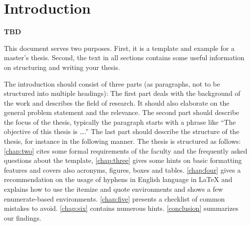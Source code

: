 \chapter{Introduction}
\label{chap:one}

\textbf{TBD}


This document serves two purposes. First, it is a template and example for a master's thesis. Second, the text in all sections contains some useful information on structuring and writing your thesis.

The introduction should consist of three parts (as paragraphs, not to be structured into multiple headings): The first part deals with the background of the work and describes the field of research. 
It should also elaborate on the general problem statement and the relevance. 
The second part should describe the focus of the thesis, typically the paragraph starts with a phrase like ``The objective of this thesis is \ldots.'' 
The last part should describe the structure of the thesis, for instance in the following manner. 
The thesis is structured as follows: \autoref{chap:two} cites some formal requirements of the faculty and the frequently asked questions about the template, \autoref{chap:three} gives some hints on basic formatting features and covers also acronyms, figures, boxes and tables. 
\autoref{chap:four} gives a recommendation on the usage of hyphens in English language in \LaTeX{} and explains how to use the itemize and quote environments and shows a few enumerate-based environments. 
\autoref{chap:five} presents a checklist of common mistakes to avoid. 
\autoref{chap:six} contains numerous hints. \autoref{conclusion} summarizes our findings.
